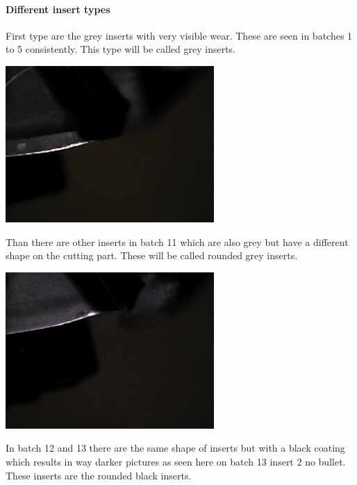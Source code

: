 \documentclass{article}
\begin{document}
\paragraph{Different insert types}

First type are the grey inserts with very visible wear. These are seen in batches 1 to 5 consistently. This type will be called grey inserts.

\includegraphics[width=3.125000in, keepaspectratio=true]{./ZimFiles_files/Vision/Dataset/automated_datasets/2_created_datasets/2_Spaghetti_dataset/gray_b_003_p_004_l_006-011_white_nb.png}



Than there are other inserts in batch 11 which are also grey but have a different shape on the cutting part. These will be called rounded grey inserts.

\includegraphics[width=3.125000in, keepaspectratio=true]{./ZimFiles_files/Vision/Dataset/automated_datasets/2_created_datasets/2_Spaghetti_dataset/rounded_grey_b_011_p_008_l_006-011_white_nb.png}

In batch 12 and 13 there are the same shape of inserts but with a black coating which results in way darker pictures as seen here on batch 13 insert 2 no bullet. These inserts are the rounded black inserts.
\end{document}
